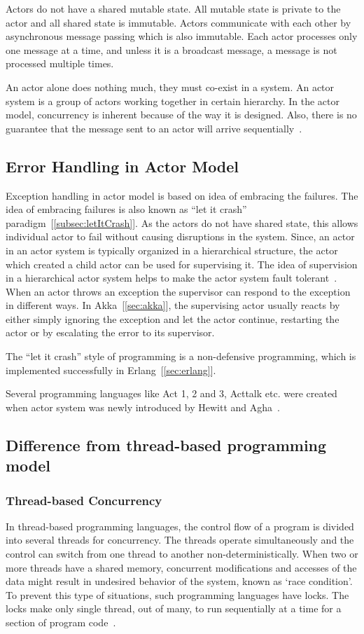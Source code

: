 Actors do not have a shared mutable state. All mutable state is private to the actor and all shared state is immutable. Actors communicate with each other by asynchronous message passing which is also immutable. Each actor processes only one message at a time, and unless it is a broadcast message, a message is not processed multiple times.

  An actor alone does nothing much, they must co-exist in a system. An actor system is a group of actors working together in certain hierarchy.
  In the actor model, concurrency is inherent because of the way it is designed. Also, there is no guarantee that the message sent to an actor will arrive sequentially~\cite{hewittVideo}.

\subsection{Error Handling in Actor Model}
Exception handling in actor model is based on idea of embracing the failures. The idea of embracing failures is also known as “let it crash” paradigm~[\autoref{subsec:letItCrash}]. As the actors do not have shared state, this allows individual actor to fail without causing disruptions in the system. Since, an actor in an actor system is typically organized in a hierarchical structure, the actor which created a child actor can be used for supervising it. The idea of supervision in a hierarchical actor system helps to make the actor system fault tolerant~\cite{Erb2012}. When an actor throws an exception the supervisor can respond to the exception in different ways. In Akka~[\autoref{sec:akka}], the supervising actor usually reacts by either simply ignoring the exception and let the actor continue, restarting the actor or by escalating the error to its supervisor.

  The “let it crash” style of programming is a non-defensive programming, which is implemented successfully in Erlang~[\autoref{sec:erlang}].

  Several programming languages like Act 1, 2 and 3, Acttalk etc. were created when actor system was newly introduced by Hewitt and Agha~\cite{agha, hewitt}.

\subsection{Difference from thread-based programming model}
\subsubsection{Thread-based Concurrency}
  \label{subsec:thread}
  In thread-based programming languages, the control flow of a program is divided into several threads for concurrency. The threads operate simultaneously and the control can switch from one thread to another non-deterministically. When two or more threads have a shared memory, concurrent modifications and accesses of the data might result in undesired behavior of the system, known as ‘race condition’. To prevent this type of situations, such programming languages have locks. The locks make only single thread, out of many, to run sequentially at a time for a section of program code~\cite{ambientTalk}.

